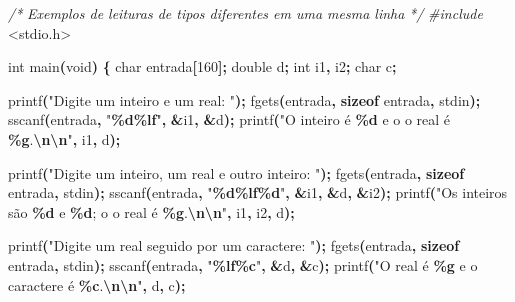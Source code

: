 \documentclass[
  11pt,
  a4paper,
]{scrbook}
\newenvironment{Shaded}{\begin{snugshade}}{\end{snugshade}}
\newcommand{\CommentTok}[1]{\textcolor[rgb]{0.56,0.35,0.01}{\textit{#1}}}
\newcommand{\DataTypeTok}[1]{\textcolor[rgb]{0.13,0.29,0.53}{#1}}
\newcommand{\DecValTok}[1]{\textcolor[rgb]{0.00,0.00,0.81}{#1}}
\newcommand{\ImportTok}[1]{#1}
\newcommand{\KeywordTok}[1]{\textcolor[rgb]{0.13,0.29,0.53}{\textbf{#1}}}
\newcommand{\NormalTok}[1]{#1}
\newcommand{\OperatorTok}[1]{\textcolor[rgb]{0.81,0.36,0.00}{\textbf{#1}}}
\newcommand{\PreprocessorTok}[1]{\textcolor[rgb]{0.56,0.35,0.01}{\textit{#1}}}
\newcommand{\SpecialCharTok}[1]{\textcolor[rgb]{0.81,0.36,0.00}{\textbf{#1}}}
\newcommand{\StringTok}[1]{\textcolor[rgb]{0.31,0.60,0.02}{#1}}
\begin{document}
\begin{Shaded}
\begin{Highlighting}[]
\CommentTok{/*}
\CommentTok{Exemplos de leituras de tipos diferentes em uma mesma linha}
\CommentTok{*/}
\PreprocessorTok{\#include }\ImportTok{\textless{}stdio.h\textgreater{}}

\DataTypeTok{int}\NormalTok{ main}\OperatorTok{(}\DataTypeTok{void}\OperatorTok{)} \OperatorTok{\{}
    \DataTypeTok{char}\NormalTok{ entrada}\OperatorTok{[}\DecValTok{160}\OperatorTok{];}
    \DataTypeTok{double}\NormalTok{ d}\OperatorTok{;}
    \DataTypeTok{int}\NormalTok{ i1}\OperatorTok{,}\NormalTok{ i2}\OperatorTok{;}
    \DataTypeTok{char}\NormalTok{ c}\OperatorTok{;}

\NormalTok{    printf}\OperatorTok{(}\StringTok{"Digite um inteiro e um real: "}\OperatorTok{);}
\NormalTok{    fgets}\OperatorTok{(}\NormalTok{entrada}\OperatorTok{,} \KeywordTok{sizeof}\NormalTok{ entrada}\OperatorTok{,}\NormalTok{ stdin}\OperatorTok{);}
\NormalTok{    sscanf}\OperatorTok{(}\NormalTok{entrada}\OperatorTok{,} \StringTok{"}\SpecialCharTok{\%d\%lf}\StringTok{"}\OperatorTok{,} \OperatorTok{\&}\NormalTok{i1}\OperatorTok{,} \OperatorTok{\&}\NormalTok{d}\OperatorTok{);}
\NormalTok{    printf}\OperatorTok{(}\StringTok{"O inteiro é }\SpecialCharTok{\%d}\StringTok{ e o o real é }\SpecialCharTok{\%g}\StringTok{.}\SpecialCharTok{\textbackslash{}n\textbackslash{}n}\StringTok{"}\OperatorTok{,}\NormalTok{ i1}\OperatorTok{,}\NormalTok{ d}\OperatorTok{);}

\NormalTok{    printf}\OperatorTok{(}\StringTok{"Digite um inteiro, um real e outro inteiro: "}\OperatorTok{);}
\NormalTok{    fgets}\OperatorTok{(}\NormalTok{entrada}\OperatorTok{,} \KeywordTok{sizeof}\NormalTok{ entrada}\OperatorTok{,}\NormalTok{ stdin}\OperatorTok{);}
\NormalTok{    sscanf}\OperatorTok{(}\NormalTok{entrada}\OperatorTok{,} \StringTok{"}\SpecialCharTok{\%d\%lf\%d}\StringTok{"}\OperatorTok{,} \OperatorTok{\&}\NormalTok{i1}\OperatorTok{,} \OperatorTok{\&}\NormalTok{d}\OperatorTok{,} \OperatorTok{\&}\NormalTok{i2}\OperatorTok{);}
\NormalTok{    printf}\OperatorTok{(}\StringTok{"Os inteiros são }\SpecialCharTok{\%d}\StringTok{ e }\SpecialCharTok{\%d}\StringTok{; o o real é }\SpecialCharTok{\%g}\StringTok{.}\SpecialCharTok{\textbackslash{}n\textbackslash{}n}\StringTok{"}\OperatorTok{,}\NormalTok{ i1}\OperatorTok{,}\NormalTok{ i2}\OperatorTok{,}\NormalTok{ d}\OperatorTok{);}

\NormalTok{    printf}\OperatorTok{(}\StringTok{"Digite um real seguido por um caractere: "}\OperatorTok{);}
\NormalTok{    fgets}\OperatorTok{(}\NormalTok{entrada}\OperatorTok{,} \KeywordTok{sizeof}\NormalTok{ entrada}\OperatorTok{,}\NormalTok{ stdin}\OperatorTok{);}
\NormalTok{    sscanf}\OperatorTok{(}\NormalTok{entrada}\OperatorTok{,} \StringTok{"}\SpecialCharTok{\%lf\%c}\StringTok{"}\OperatorTok{,} \OperatorTok{\&}\NormalTok{d}\OperatorTok{,} \OperatorTok{\&}\NormalTok{c}\OperatorTok{);}
\NormalTok{    printf}\OperatorTok{(}\StringTok{"O real é }\SpecialCharTok{\%g}\StringTok{ e o caractere é }\SpecialCharTok{\%c}\StringTok{.}\SpecialCharTok{\textbackslash{}n\textbackslash{}n}\StringTok{"}\OperatorTok{,}\NormalTok{ d}\OperatorTok{,}\NormalTok{ c}\OperatorTok{);}


\end{Highlighting}
\end{Shaded}
\end{document}
